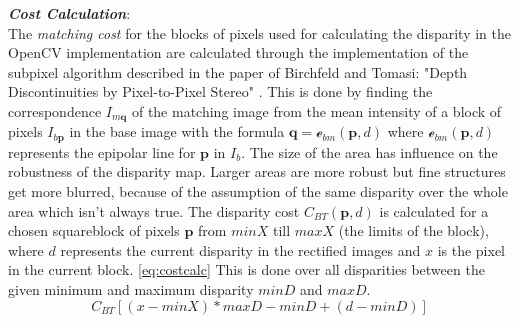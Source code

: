\documentclass[a4paper]{article}
\begin{document}
\emph{\textbf{Cost Calculation}}:\\
The \emph{matching cost} for the blocks of pixels used for calculating
the disparity in the OpenCV implementation are calculated through the
implementation of the subpixel algorithm described in the paper of
Birchfeld and Tomasi: "Depth Discontinuities by Pixel-to-Pixel Stereo"
\cite{birchtom99}. This is done by finding the correspondence
$I_{m\mathbf{q}}$ of the matching image from the mean intensity of a
block of pixels $I_{b\mathbf{p}}$ in the base image with the formula
$\mathbf{q} = \mathcal{e}_{bm}(\mathbf{p}, d)$ where
$\mathcal{e}_{bm}(\mathbf{p}, d)$ represents the epipolar line for
$\mathbf{p}$ in $I_b$. The size of the area has influence on the
robustness of the disparity map. Larger areas are more robust but fine
structures get more blurred, because of the assumption of the same
disparity over the whole area which isn't always true. The disparity
cost $C_{BT}( \mathbf{p},d)$ is calculated for a chosen squareblock of
pixels $\mathbf{p}$ from $minX$ till $maxX$ (the limits of the block),
where $d$ represents the current disparity in the rectified images and
$x$ is the pixel in the current block. \eqref{eq:costcalc} This is
done over all disparities between the given minimum and maximum
disparity $minD$ and $maxD$.\\
\begin{equation}
  \label{eq:costcalc}
  C_{BT}[(x-minX)*maxD - minD + (d - minD)]
\end{equation}
\end{document}
